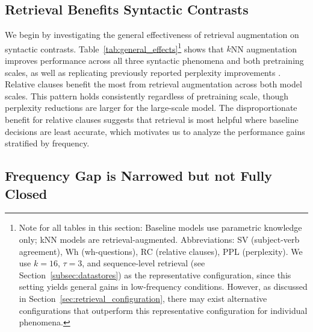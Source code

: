 \subsection{Retrieval Benefits Syntactic Contrasts}
We begin by investigating the general effectiveness of retrieval augmentation on syntactic contrasts. Table~\ref{tab:general_effects}\footnote{Note for all tables in this section: Baseline models use parametric knowledge only; kNN models are retrieval-augmented. Abbreviations: SV (subject-verb agreement), Wh (wh-questions), RC (relative clauses), PPL (perplexity). We use $k=16$, $\tau=3$, and sequence-level retrieval (see Section~\ref{subsec:datastores}) as the representative configuration, since this setting yields general gains in low-frequency conditions. However, as discussed in Section~\ref{sec:retrieval_configuration}, there may exist alternative configurations that outperform this representative configuration for individual phenomena.} shows that $k$NN augmentation improves performance across all three syntactic phenomena and both pretraining scales, as well as replicating previously reported perplexity improvements \citep{khandelwal2020knnlm}. Relative clauses benefit the most from retrieval augmentation across both model scales. This pattern holds consistently regardless of pretraining scale, though perplexity reductions are larger for the large-scale model. The disproportionate benefit for relative clauses suggests that retrieval is most helpful where baseline decisions are least accurate, which motivates us to analyze the performance gains stratified by frequency.


\subsection{Frequency Gap is Narrowed but not Fully Closed}
\label{sec:frequency_effects}


